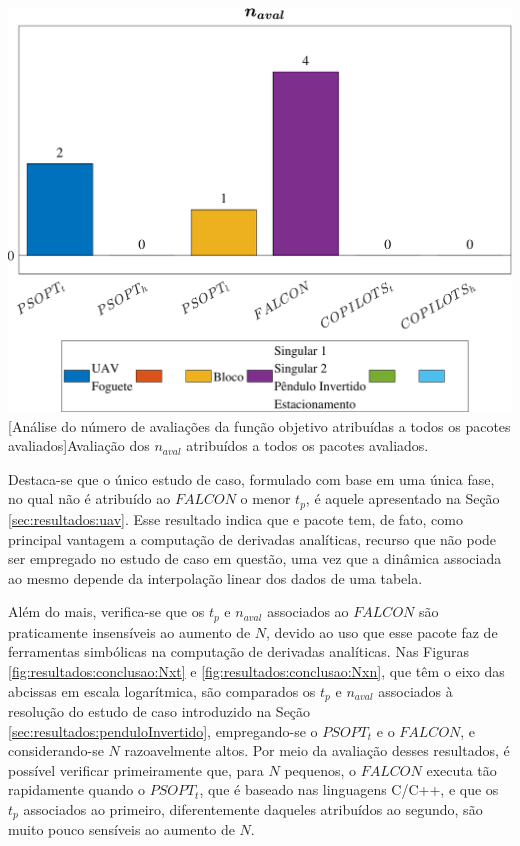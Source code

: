 \noindent	
\begin{minipage}{\textwidth}
	\vspace{\onelineskip}
	\centering
	\includegraphics[width=1\linewidth]{fig/resultados/ranking/all/eval}
	[Análise do número de avaliações da função objetivo atribuídas a todos os pacotes avaliados]{Avaliação dos $ n_{aval} $ atribuídos a todos os pacotes avaliados.}
	\label{fig:resultados:conclusao:navalFALCON}
	\vspace{\onelineskip}
\end{minipage}

Destaca-se que o único estudo de caso, formulado com base em uma única fase, no qual não é atribuído ao $ FALCON $ o menor $ t_p $, é aquele apresentado na Seção \ref{sec:resultados:uav}. Esse resultado indica que e pacote tem, de fato, como principal vantagem a computação de derivadas analíticas, recurso que não pode ser empregado no estudo de caso em questão, uma vez que a dinâmica associada ao mesmo depende da interpolação linear dos dados de uma tabela. 


Além do mais, verifica-se que os $ t_p $ e $ n_{aval} $ associados ao $ FALCON $ são praticamente insensíveis ao aumento de $ N $, devido ao uso que esse pacote faz de ferramentas simbólicas na computação de derivadas analíticas. Nas Figuras \ref{fig:resultados:conclusao:Nxt} e \ref{fig:resultados:conclusao:Nxn}, que têm o eixo das abcissas em escala logarítmica, são comparados os $ t_p $ e $ n_{aval} $ associados à resolução do estudo de caso introduzido na Seção \ref{sec:resultados:penduloInvertido}, empregando-se o $ PSOPT_t $ e o $ FALCON $, e considerando-se $ N $ razoavelmente altos. Por meio da avaliação desses resultados, é possível verificar primeiramente que, para $ N $ pequenos, o $ FALCON $ executa tão rapidamente quando o $ PSOPT_t $, que é baseado nas linguagens C/C++, e que os $ t_p $ associados ao primeiro, diferentemente daqueles atribuídos ao segundo, são muito pouco sensíveis ao aumento de $ N $. 

